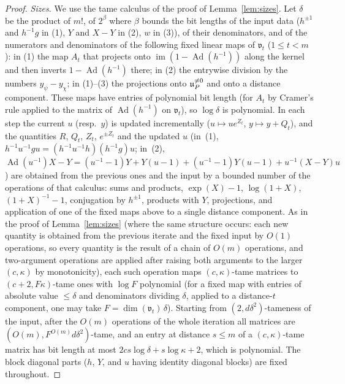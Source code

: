 \begin{proof}
\emph{Sizes.} We use the tame calculus of the proof of Lemma~\ref{lem:sizes}. Let $\delta$ be the
product of $m!$, of $2^{\beta}$ where $\beta$ bounds the bit lengths of the input data ($h^{\pm1}$ and
$h^{-1}g$ in (1), $Y$ and $X-Y$ in (2), $w$ in (3)), of their denominators, and of the numerators and
denominators of the following fixed linear maps of $\mathfrak v_t$ ($1\le t<m$): in (1) the map $A_t$ that
projects onto $\operatorname{im}(1-\operatorname{Ad}(h^{-1}))$ along the kernel and then inverts $1-\operatorname{Ad}(h^{-1})$ there; in (2) the
entrywise division by the numbers $y_\psi-y_\chi$; in (1)--(3) the projections onto $\mathfrak{u}_P^{\ne0}$ and
onto a distance component. These maps have entries of polynomial bit length (for $A_t$ by Cramer's
rule applied to the matrix of $\operatorname{Ad}(h^{-1})$ on $\mathfrak v_t$), so $\log\delta$ is polynomial. In
each step the current $u$ (resp.\ $y$) is updated incrementally ($u\mapsto ue^{Z_t}$, $y\mapsto y+Q_t$),
and the quantities $R$, $Q_t$, $Z_t$, $e^{\pm Z_t}$ and the updated $u$ (in~(1),
$h^{-1}u^{-1}gu=(h^{-1}u^{-1}h)(h^{-1}g)u$; in~(2),
$\operatorname{Ad}(u^{-1})X-Y=(u^{-1}-1)Y+Y(u-1)+(u^{-1}-1)Y(u-1)+u^{-1}(X-Y)u$) are obtained from the previous
ones and the input by a bounded number of the operations of that calculus: sums and products,
$\exp(X)-1$, $\log(1+X)$, $(1+X)^{-1}-1$, conjugation by $h^{\pm1}$, products with $Y$, projections, and
application of one of the fixed maps above to a single distance component. As in the proof of
Lemma~\ref{lem:sizes} (where the same structure occurs: each new quantity is obtained from the
previous iterate and the fixed input by $O(1)$ operations, so every quantity is the result of a chain
of $O(m)$ operations, and two-argument operations are applied after raising both arguments to the
larger $(c,\kappa)$ by monotonicity), each such operation maps $(c,\kappa)$-tame matrices to
$(c+2,F\kappa)$-tame ones with $\log F$ polynomial (for a fixed map with entries of absolute value
$\le\delta$ and denominators dividing $\delta$, applied to a distance-$t$ component, one may take
$F=\dim(\mathfrak v_t)\,\delta$). Starting from $(2,d\delta^2)$-tameness of the input, after the $O(m)$
operations of the whole iteration all matrices are $(O(m),F^{O(m)}d\delta^2)$-tame, and an entry at
distance $s\le m$ of a $(c,\kappa)$-tame matrix has bit length at most $2cs\log\delta+s\log\kappa+2$,
which is polynomial. The block diagonal parts ($h$, $Y$, and $u$ having identity diagonal blocks) are
fixed throughout.
\end{proof}


